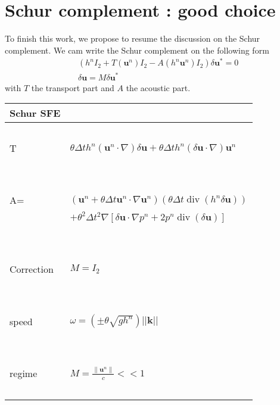 \documentclass[a4paper, 11pt]{article}
\begin{document}
\section{Schur complement : good choice}
To finish this work, we propose to resume the discussion on the Schur complement.
We cam write the Schur complement on the following form
\begin{align*}
&\left(h^n I_2 + T(\boldsymbol{u}^n) I_2 - A(h^n\boldsymbol{u}^n)I_2\right)\delta \boldsymbol{u}^* =0\\
&\delta \boldsymbol{u} = M \delta \boldsymbol{u}^*
\end{align*}
with $T$ the transport part and $A$ the acoustic part.
\begin{table}
\begin{tabular}{|l|l|}
  \hline
  Schur SFE &  \\
  \hline
  ~ & ~\\
  T &  $\theta\Delta th^n\left(\boldsymbol{u}^n\cdot\nabla\right)\delta \boldsymbol{u}+\theta\Delta th^n\left(\delta \boldsymbol{u} \cdot\nabla\right)\boldsymbol{u}^n$ \\ 
  ~ & ~\\
    \hline
   ~& ~\\ 
  A= &$\left(\boldsymbol{u}^n+\theta \Delta t \boldsymbol{u}^n\cdot \nabla \boldsymbol{u}^n \right)\left(\theta \Delta t \operatorname{div}(h^n \delta \boldsymbol{u})\right) $\\
  ~&$+\theta^2 \Delta t^2 \nabla\left[ \delta \boldsymbol{u}\cdot \nabla p^n + 2p^n \operatorname{div}(\delta \boldsymbol{u}) \right] $\\
  ~ & ~\\
    \hline
     ~ &~ \\
   Correction &  $M=I_2$ \\ 
   ~ & ~\\
    \hline
     ~ &~ \\
  speed & $\omega=\left(\pm\theta\sqrt{gh^n}\right)||\boldsymbol{k}||$ \\ 
   ~ & ~\\
    \hline
    ~& ~\\
  regime & $M= \frac{\parallel \boldsymbol{u}^n \parallel }{c}<< 1$\\
   ~& ~\\
    \hline
\end{tabular}
\end{table}
\end{document}
